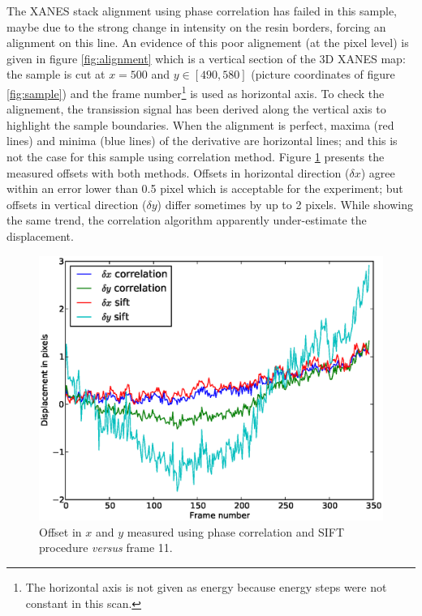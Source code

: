 \documentclass[preprint]{iucr}
\begin{document}
The XANES stack alignment using phase correlation has failed in this sample,
maybe due to the strong change in intensity on the resin borders, forcing an
alignment on this line. An evidence of this poor alignement (at the pixel
level) is given in figure \ref{fig:alignment} which is a vertical section of the
3D XANES map: the sample is cut at $x=500$ and $y\in[490, 580]$ (picture
coordinates of figure \ref{fig:sample}) and the frame number\footnote{The 
horizontal axis is not given as energy because energy steps were not
constant in this scan.} is used as horizontal axis.
To check the alignement, the transission signal has been derived along the
vertical axis to highlight the sample boundaries.
When the alignment is perfect, maxima (red lines) and minima (blue lines) of
the derivative are horizontal lines; and this is not the case
for this sample using correlation method. Figure \ref{fig:offset}
presents the measured offsets with both methods. 
Offsets in horizontal direction ($\delta x$) agree within an error
lower than 0.5 pixel which is acceptable for the experiment; but offsets in
vertical direction ($\delta y$) differ sometimes by up to 2 pixels. While
showing the same trend, the correlation algorithm apparently under-estimate the
displacement.

\begin{figure}
\label{fig:offset}
\begin{center}
\includegraphics[width=15cm]{offset.eps}
\caption{Offset in $x$ and $y$ measured using phase correlation and SIFT
procedure \emph{versus} frame 11.}
\end{center}
\end{figure}
\end{document}
